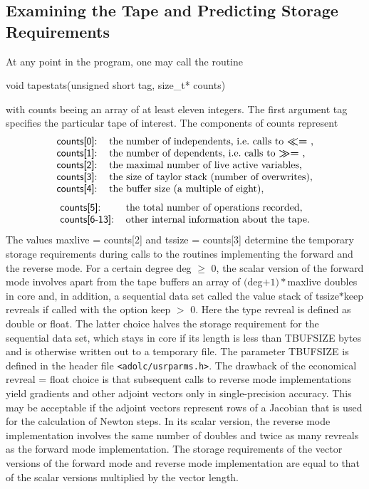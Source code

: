 \documentclass[11pt,twoside]{article}
\begin{document}
\subsection{Examining the Tape and Predicting Storage Requirements }
\label{examiningTape}
%
At any point in the program, one may call the routine
\begin{center}
{\sf void tapestats(unsigned short tag, size\_t* counts)}
\end{center}
with {\sf counts} beeing an array of at least eleven integers.
The first argument {\sf tag} specifies the particular tape of
interest. The components of {\sf counts} represent
\[
\begin{tabular}{ll}
{\sf counts[0]}: & the number of independents, i.e.~calls to \boldmath $\ll=$ \unboldmath, \\
{\sf counts[1]}: & the number of dependents, i.e.~calls to \boldmath $\gg=$ \unboldmath,\\ 
{\sf counts[2]}: & the maximal number of live active variables,\\
{\sf counts[3]}: & the size of taylor stack (number of overwrites),\\
{\sf counts[4]}: & the buffer size (a multiple of eight),
\end{tabular}
\]
\[
\begin{tabular}{ll}
{\sf counts[5]}: & the total number of operations recorded,\\
{\sf counts[6-13]}: & other internal information about the tape.
\end{tabular}
\]
The values {\sf maxlive} = {\sf counts[2]} and {\sf tssize} = {\sf counts[3]} 
determine the temporary 
storage requirements during calls to the routines
implementing the forward and the reverse mode.
For a certain degree {\sf deg} $\geq$ 0, the scalar version of the
forward mode involves apart from the tape buffers an array of 
 $(${\sf deg}$+1)*${\sf maxlive} {\sf double}s in
core and, in addition, a sequential data set called the value stack 
of {\sf tssize}$*${\sf keep} {\sf revreal}s if called with the 
option {\sf keep} $>$ 0. Here
the type {\sf revreal} is defined as {\sf double} or {\sf float}. The latter choice halves the storage
requirement for the sequential data set, which stays in core if
its length is less than {\sf TBUFSIZE} bytes and is otherwise written
out to a temporary file. The parameter {\sf TBUFSIZE} is defined in the header file \verb=<adolc/usrparms.h>=.
The drawback of the economical 
{\sf revreal} = {\sf float} choice is that subsequent calls to reverse mode implementations
yield gradients and other adjoint vectors only in single-precision
accuracy. This may be acceptable if the adjoint vectors
represent rows of a Jacobian that is  used for the calculation of
Newton steps. In its scalar version, the reverse mode implementation involves 
the same number of {\sf double}s and twice as many {\sf revreal}s as the
forward mode implementation.
The storage requirements of the vector versions of the forward mode and
reverse mode implementation are equal to that of the scalar versions multiplied by
the vector length.
%
\end{document}
